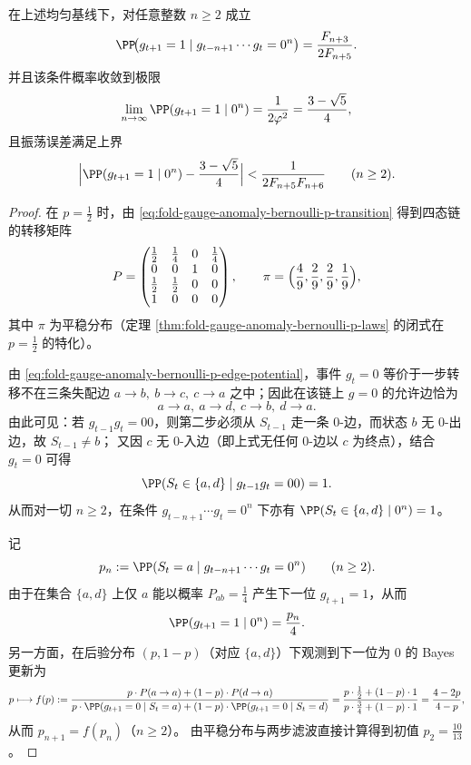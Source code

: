 \begin{theorem}\label{thm:fold-gauge-anomaly-zero-run-fibonacci}
在上述均匀基线下，对任意整数 \(n\ge 2\) 成立
\[
\PP\!\bigl(g_{t+1}=1\mid g_{t-n+1}\cdots g_t=0^n\bigr)
=\frac{F_{n+3}}{2F_{n+5}}.
\]
并且该条件概率收敛到极限
\[
\lim_{n\to\infty}\PP(g_{t+1}=1\mid 0^n)=\frac{1}{2\varphi^2}=\frac{3-\sqrt5}{4},
\]
且振荡误差满足上界
\[
\Bigl|\PP(g_{t+1}=1\mid 0^n)-\frac{3-\sqrt5}{4}\Bigr|
<\frac{1}{2F_{n+5}F_{n+6}}
\qquad(n\ge 2).
\]
\end{theorem}
\begin{proof}
在 \(p=\tfrac12\) 时，由 \eqref{eq:fold-gauge-anomaly-bernoulli-p-transition} 得到四态链的转移矩阵
\[
P=
\begin{pmatrix}
\frac12&\frac14&0&\frac14\\
0&0&1&0\\
\frac12&\frac12&0&0\\
1&0&0&0
\end{pmatrix},
\qquad
\pi=\Bigl(\frac49,\frac29,\frac29,\frac19\Bigr),
\]
其中 \(\pi\) 为平稳分布（定理 \ref{thm:fold-gauge-anomaly-bernoulli-p-laws} 的闭式在 \(p=\tfrac12\) 的特化）。
\par
由 \eqref{eq:fold-gauge-anomaly-bernoulli-p-edge-potential}，事件 \(g_t=0\) 等价于一步转移不在三条失配边
\(
a\to b,\ b\to c,\ c\to a
\)
之中；因此在该链上 \(g=0\) 的允许边恰为
\[
a\to a,\ a\to d,\ c\to b,\ d\to a.
\]
由此可见：若 \(g_{t-1}g_t=00\)，则第二步必须从 \(S_{t-1}\) 走一条 \(0\)-边，而状态 \(b\) 无 \(0\)-出边，故 \(S_{t-1}\neq b\)；
又因 \(c\) 无 \(0\)-入边（即上式无任何 \(0\)-边以 \(c\) 为终点），结合 \(g_t=0\) 可得
\[
\PP(S_t\in\{a,d\}\mid g_{t-1}g_t=00)=1.
\]
从而对一切 \(n\ge 2\)，在条件 \(g_{t-n+1}\cdots g_t=0^n\) 下亦有 \(\PP(S_t\in\{a,d\}\mid 0^n)=1\)。
\par
记
\[
p_n:=\PP(S_t=a\mid g_{t-n+1}\cdots g_t=0^n)\qquad(n\ge 2).
\]
由于在集合 \(\{a,d\}\) 上仅 \(a\) 能以概率 \(P_{ab}=\tfrac14\) 产生下一位 \(g_{t+1}=1\)，从而
\[
\PP(g_{t+1}=1\mid 0^n)=\frac{p_n}{4}.
\]
另一方面，在后验分布 \((p,1-p)\)（对应 \(\{a,d\}\)）下观测到下一位为 \(0\) 的 Bayes 更新为
\[
p\longmapsto f(p)
:=\frac{p\cdot P(a\to a)+(1-p)\cdot P(d\to a)}{p\cdot \PP(g_{t+1}=0\mid S_t=a)+(1-p)\cdot \PP(g_{t+1}=0\mid S_t=d)}
=\frac{p\cdot\frac12+(1-p)\cdot 1}{p\cdot\frac34+(1-p)\cdot 1}
=\frac{4-2p}{4-p},
\]
从而 \(p_{n+1}=f(p_n)\)（\(n\ge 2\)）。
由平稳分布与两步滤波直接计算得到初值 \(p_2=\frac{10}{13}\)。

\end{proof}
